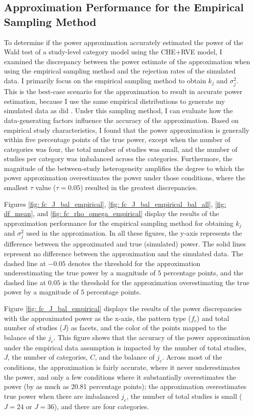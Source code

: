 \subsection{Approximation Performance for the Empirical Sampling Method}

To determine if the power approximation accurately estimated the power of the Wald test of a study-level category model using the CHE+RVE model, I examined the discrepancy between the power estimate of the approximation when using the empirical sampling method and the rejection rates of the simulated data. I primarily focus on the empirical sampling method to obtain $k_j$ and $\sigma_j^2$. This is the best-case scenario for the approximation to result in accurate power estimation, because I use the same empirical distributions to generate my simulated data as did \textcite{vembye2023}. Under this sampling method, I can evaluate how the data-generating factors influence the accuracy of the approximation. Based on empirical study characteristics, I found that the power approximation is generally within five percentage points of the true power, except when the number of categories was four, the total number of studies was small, and the number of studies per category was imbalanced across the categories. Furthermore, the magnitude of the between-study heterogeneity amplifies the degree to which the power approximation overestimates the power under those conditions, where the smallest $\tau$ value ($\tau = 0.05$) resulted in the greatest discrepancies. 

Figures \ref{fig: fc_J_bal_empirical}, \ref{fig: fc_J_bal_empirical_bal_all}, \ref{fig: df_mean}, and \ref{fig: fc_rho_omega_empirical} display the results of the approximation performance for the empirical sampling method for obtaining $k_j$ and $\sigma_j^2$ used in the approximation. In all these figures, the y-axis represents the difference between the approximated and true (simulated) power. The solid lines represent no difference between the approximation and the simulated data. The dashed line at $-0.05$ denotes the threshold for the approximation underestimating the true power by a magnitude of $5$ percentage points, and the dashed line at $0.05$ is the threshold for the approximation overestimating the true power by a magnitude of $5$ percentage points. 

Figure \ref{fig: fc_J_bal_empirical} displays the results of the power discrepancies with the approximated power as the x-axis, the pattern type ($f_c$) and total number of studies ($J$) as facets, and the color of the points mapped to the balance of the $j_c$. This figure shows that the accuracy of the power approximation under the empirical data assumption is impacted by the number of total studies, $J$, the number of categories, $C$, and the balance of $j_c$. Across most of the conditions, the approximation is fairly accurate, where it never underestimates the power, and only a few conditions where it substantially overestimates the power (by as much as 20.81 percentage points); the approximation overestimates true power when there are imbalanced $j_c$, the number of total studies is small ($J = 24$ or $J = 36$), and there are four categories. 

